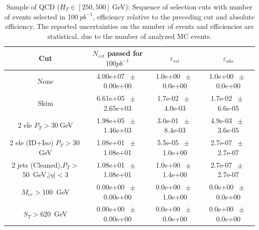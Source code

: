 \begin{table}[htbp] 
\begin{center} 
\begin{tabular}{|c|c|c|c|} 
\hline\hline 
 Cut & $N_{evt}$ passed for $100pb^{-1}$ & $\varepsilon_{rel}$ & $\varepsilon_{abs}$ \\ 
\hline\hline 
None       &        4.00e+07       $~\pm~$       0.00e+00        &        1.0e+00       $~\pm~$       0.0e+00        &        1.0e+00       $~\pm~$       0.0e+00       \\       
       Skim       &        6.61e+05       $~\pm~$       2.65e+03        &        1.7e-02       $~\pm~$       4.0e-03        &        1.7e-02       $~\pm~$       6.6e-05       \\       
       2 ele $P_T>30~$GeV       &        1.98e+05       $~\pm~$       1.46e+03        &        3.0e-01       $~\pm~$       8.4e-03        &        4.9e-03       $~\pm~$       3.6e-05       \\       
       2 ele (ID+Iso) $P_T>30~$GeV       &        1.08e+01       $~\pm~$       1.08e+01        &        5.5e-05       $~\pm~$       1.0e+00        &        2.7e-07       $~\pm~$       2.7e-07       \\       
       2 jets (Cleaned),$P_T>$50~GeV,$|\eta|<$3       &        1.08e+01       $~\pm~$       1.08e+01        &        1.0e+00       $~\pm~$       1.4e+00        &        2.7e-07       $~\pm~$       2.7e-07       \\       
       $M_{ee}>$100~GeV       &        0.00e+00       $~\pm~$       0.00e+00        &        0.0e+00       $~\pm~$       1.0e+00        &        0.0e+00       $~\pm~$       0.0e+00       \\       
       $S_T>$620~GeV       &        0.00e+00       $~\pm~$       0.00e+00        &        0.0e+00       $~\pm~$       0.0e+00        &        0.0e+00       $~\pm~$       0.0e+00       \\       
       \hline\hline 
\end{tabular} 
\end{center} 
\caption{Sample of QCD ($H_T \in [250,500]~$GeV): Sequence of selection cuts with number of events selected in 100$~pb^{-1}$, efficiency relative to the preceding cut and absolute efficiency. The reported uncertainties on the number of events and efficiencies are statistical, due to the number of analyzed MC events.} 
\label{tab:effic-QCD-250-500} 
\end{table} 

